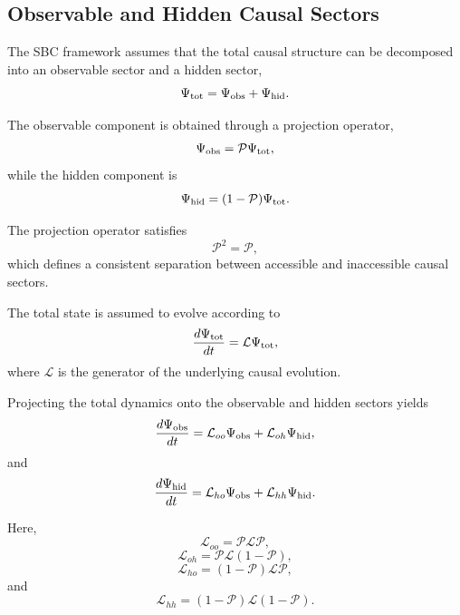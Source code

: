 \subsection{Observable and Hidden Causal Sectors}

The SBC framework assumes that the total causal structure can be decomposed into an observable sector and a hidden sector,
\begin{equation}
\Psi_{\rm tot}
=
\Psi_{\rm obs}
+
\Psi_{\rm hid}.
\end{equation}

The observable component is obtained through a projection operator,
\begin{equation}
\Psi_{\rm obs}
=
\mathcal P \Psi_{\rm tot},
\end{equation}
while the hidden component is
\begin{equation}
\Psi_{\rm hid}
=
(1-\mathcal P)\Psi_{\rm tot}.
\end{equation}

The projection operator satisfies
\begin{equation}
\mathcal P^2=\mathcal P,
\end{equation}
which defines a consistent separation between accessible and inaccessible causal sectors.

The total state is assumed to evolve according to
\begin{equation}
\frac{d\Psi_{\rm tot}}{dt}
=
\mathcal L \Psi_{\rm tot},
\end{equation}
where \(\mathcal L\) is the generator of the underlying causal evolution.

Projecting the total dynamics onto the observable and hidden sectors yields
\begin{equation}
\frac{d\Psi_{\rm obs}}{dt}
=
\mathcal L_{oo}\Psi_{\rm obs}
+
\mathcal L_{oh}\Psi_{\rm hid},
\end{equation}
and
\begin{equation}
\frac{d\Psi_{\rm hid}}{dt}
=
\mathcal L_{ho}\Psi_{\rm obs}
+
\mathcal L_{hh}\Psi_{\rm hid}.
\end{equation}

Here,
\begin{equation}
\mathcal L_{oo}
=
\mathcal P\mathcal L\mathcal P,
\end{equation}
\begin{equation}
\mathcal L_{oh}
=
\mathcal P\mathcal L(1-\mathcal P),
\end{equation}
\begin{equation}
\mathcal L_{ho}
=
(1-\mathcal P)\mathcal L\mathcal P,
\end{equation}
and
\begin{equation}
\mathcal L_{hh}
=
(1-\mathcal P)\mathcal L(1-\mathcal P).
\end{equation}

